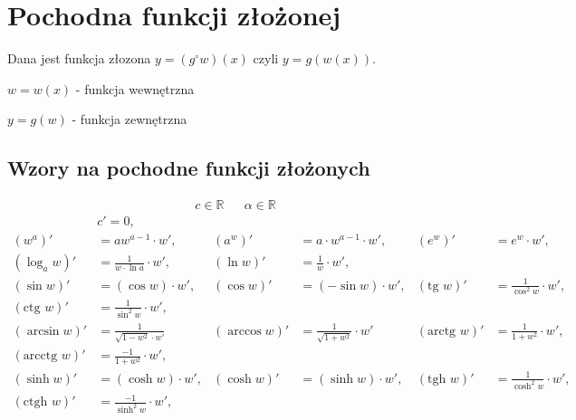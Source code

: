 \documentclass[11pt]{article}
\begin{document}
\section{Pochodna funkcji złożonej}
\label{sec:org30aaaeb}
Dana jest funkcja złozona \(y = (g^\circ w)(x)\) czyli \(y = g(w(x))\).

\(w = w(x)\) - funkcja wewnętrzna

\(y = g(w)\) - funkcja zewnętrzna
\subsection{Wzory na pochodne funkcji złożonych}
\label{sec:orgf1a6c74}
\begin{align*}
c \in \mathbb{R} && \alpha \in \mathbb{R}
\end{align*}
\begin{align*}
  & c' = 0,
  \\ \left(w^{a}\right)'&= a w^{a-1} \cdot w',
                        & \left(a^{w} \right)' &= a  \cdot w^{a-1} \cdot w',
                                               & \left( e^{w} \right)' &= e^{w} \cdot w',
  \\ \left(\log_{a}w \right)' &= \frac{1}{w \cdot \ln a} \cdot w',
                        & \left( \ln w \right)' &= \frac{1}{w} \cdot w',
  \\ \left( \sin w \right)' &= (\cos w) \cdot w',
                        & \left( \cos w \right)' &= (- \sin w) \cdot w',
                                               & \left( \text{tg } w \right)' &= \frac{1}{\cos^{2} w} \cdot w' ,
  \\ \left(\text{ctg } w \right)' &= \frac{1}{\sin^{2} w} \cdot w',
  \\  \left( \arcsin w \right)' &= \frac{1}{\sqrt{1-w^{2}} \cdot w'}
                        & \left(\arccos w \right)' &=\frac{1}{\sqrt{1+w^{2}}} \cdot w'
                                               & \left( \text{arctg } w \right)' &= \frac{1}{1+w^{2}} \cdot w',
  \\ \left( \text{arcctg } w \right)' &= \frac{-1}{1+w^{2}} \cdot w',
  \\  \left( \sinh w \right )' &=  (\cosh w) \cdot w' ,
                        & \left( \cosh w \right )' &= (\sinh w) \cdot w',
                                               & \left( \text{tgh } w \right )' &= \frac{1}{\cosh^{2} w} \cdot w',
  \\ \left( \text{ctgh } w \right )' &= \frac{-1}{\sinh ^{2} w} \cdot w',
\end{align*}
\end{document}
